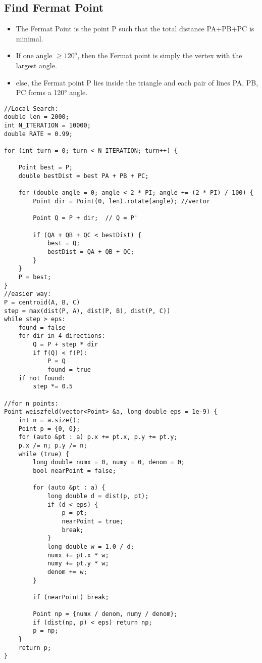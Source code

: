 \documentclass[11pt,a4paper]{article}
\begin{document}
\begin{multicols*}{2}
\subsection{Find Fermat Point}
\begin{itemize}
    \item The Fermat Point is the point P such that the total distance PA+PB+PC is minimal.
    \item If one angle $\geq 120^o$, then the Fermat point is simply the vertex with the largest angle.
    \item else, the Fermat point P lies inside the triangle and each pair of lines PA, PB, PC forms a 120° angle.
\end{itemize}
\begin{lstlisting}
//Local Search:
double len = 2000;  
int N_ITERATION = 10000;  
double RATE = 0.99;  

for (int turn = 0; turn < N_ITERATION; turn++) {  

	Point best = P;  
	double bestDist = best PA + PB + PC;

	for (double angle = 0; angle < 2 * PI; angle += (2 * PI) / 100) {
		Point dir = Point(0, len).rotate(angle); //vertor 
		
		Point Q = P + dir;  // Q = P'
		
		if (QA + QB + QC < bestDist) {
            best = Q;
            bestDist = QA + QB + QC;
        }
    }
	P = best;
}
//easier way:
P = centroid(A, B, C)
step = max(dist(P, A), dist(P, B), dist(P, C))
while step > eps:
    found = false
    for dir in 4 directions:
        Q = P + step * dir
        if f(Q) < f(P):
            P = Q
            found = true
    if not found:
        step *= 0.5

//for n points:
Point weiszfeld(vector<Point> &a, long double eps = 1e-9) {
    int n = a.size();
    Point p = {0, 0};
    for (auto &pt : a) p.x += pt.x, p.y += pt.y;
    p.x /= n; p.y /= n;
    while (true) {
        long double numx = 0, numy = 0, denom = 0;
        bool nearPoint = false;

        for (auto &pt : a) {
            long double d = dist(p, pt);
            if (d < eps) { 
                p = pt;
                nearPoint = true;
                break;
            }
            long double w = 1.0 / d;
            numx += pt.x * w;
            numy += pt.y * w;
            denom += w;
        }

        if (nearPoint) break;

        Point np = {numx / denom, numy / denom};
        if (dist(np, p) < eps) return np;
        p = np;
    }
    return p;
}


\end{lstlisting}
\end{multicols*}
\end{document}
